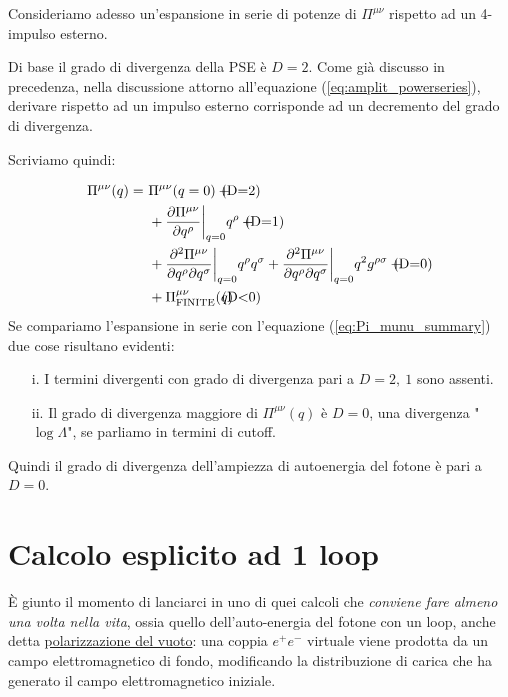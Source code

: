 \documentclass[../main.tex]{subfiles}
\begin{document}
Consideriamo adesso un'espansione in serie di potenze di $\Pi^{\mu\nu}$ rispetto ad un 4-impulso esterno.

\begin{nota}
Di base il grado di divergenza della PSE è $D=2$. Come già discusso in precedenza, nella discussione attorno all'equazione (\ref{eq:amplit_powerseries}), derivare rispetto ad un impulso esterno corrisponde ad un decremento del grado di divergenza.
\end{nota}

Scriviamo quindi:

\begin{align*}
    \Pi^{\mu\nu}(q) =~ & \Pi^{\mu\nu}(q=0) + \tag*{\llap{(D=2)}} \\
                    & + \frac{\partial \Pi^{\mu\nu}}{\partial q^\rho}\bigg|_{q=0}q^\rho + \tag*{\llap{(D=1)}}\\
                    & + \frac{\partial^2 \Pi^{\mu\nu}}{\partial q^\rho\partial q^\sigma}\bigg|_{q=0}q^\rho q^\sigma + \frac{\partial^2 \Pi^{\mu\nu}}{\partial q^\rho\partial q^\sigma}\bigg|_{q=0}q^2 g^{\rho\sigma} +  \tag*{\llap{(D=0)}}\\
                    & + \Pi^{\mu\nu}_\text{FINITE}(q) \tag*{\llap{(D<0)}}
\end{align*}
Se compariamo l'espansione in serie con l'equazione (\ref{eq:Pi_munu_summary}) due cose risultano evidenti:
\begin{enumerate}
    \item[i.] I termini divergenti con grado di divergenza pari a $D=2,~1$ sono assenti.
    \item[ii.] Il grado di divergenza maggiore di $\Pi^{\mu\nu}(q)$ è $D=0$, una divergenza "$\log\Lambda$", se parliamo in termini di cutoff.
\end{enumerate}

Quindi il grado di divergenza dell'ampiezza di autoenergia del fotone è pari a $\boxed{D=0}$.

\section{Calcolo esplicito ad 1 loop}
\label{sec:1loop_pse_calc}

È giunto il momento di lanciarci in uno di quei calcoli che \textit{conviene fare almeno una volta nella vita}, ossia quello dell'auto-energia del fotone con un loop, anche detta \href{https://it.wikipedia.org/wiki/Polarizzazione_del_vuoto}{\textbf{}{polarizzazione del vuoto}}: una coppia $e^+e^-$ virtuale viene prodotta da un campo elettromagnetico di fondo, modificando la distribuzione di carica che ha generato il campo elettromagnetico iniziale.
\end{document}
